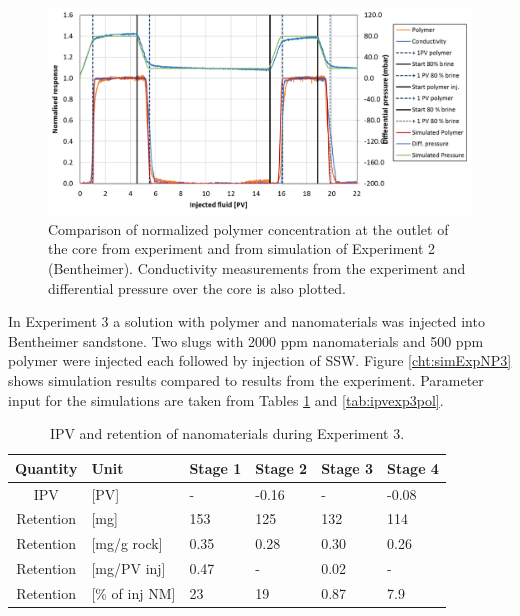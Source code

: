 \documentclass[nanomaterials,article,submit,moreauthors,pdftex]{Definitions/mdpi}
\begin{document}
\begin{figure}[h!]
    \centering
    \includegraphics[width=.8\textwidth]{fig/simExpNP2.png}
    \caption{Comparison of normalized polymer concentration at the outlet of the core from experiment and from simulation of Experiment 2 (Bentheimer). Conductivity measurements from the experiment and differential pressure over the core is also plotted.}
    \label{cht:simExpNP2}
\end{figure}

In Experiment 3 a solution with polymer and nanomaterials was injected into Bentheimer sandstone. Two slugs with 2000 ppm nanomaterials and 500 ppm polymer were injected each followed by injection of SSW. Figure \ref{cht:simExpNP3} shows simulation results compared to results from the experiment. Parameter input for the simulations are taken from Tables \ref{tab:ipvexp3} and \ref{tab:ipvexp3pol}.

\begin{table}[h!] 
\small
\centering
\caption{IPV and retention of nanomaterials during Experiment 3.}
\label{tab:ipvexp3}
\begin{tabular}{c l l l l l } 
\toprule
\textbf{Quantity} & \textbf{Unit} & \textbf{Stage 1} & \textbf{Stage 2} & \textbf{Stage 3} & \textbf{Stage 4} \\ 
\midrule 
IPV         & [PV]          & -         & -0.16     & -         & -0.08     \\
Retention   & [mg]          & 153       & 125       & 132       & 114       \\ 
Retention   & [mg/g rock]   & 0.35      & 0.28     & 0.30     & 0.26     \\ 
Retention   & [mg/PV inj]   & 0.47      & -         & 0.02      & -         \\
Retention   & [\% of inj NM]& 23        & 19       & 0.87       & 7.9       \\ 
\bottomrule
\end{tabular}
\end{table}
\end{document}
